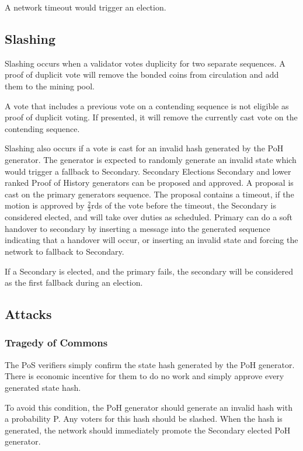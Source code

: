 \documentclass[12pt]{article}
\begin{document}
A network timeout would trigger an election.

\subsection{Slashing}
Slashing occurs when a validator votes duplicity for two separate sequences.  A proof of duplicit vote will remove the bonded coins from circulation and add them to the mining pool.

A vote that includes a previous vote on a contending sequence is not eligible as proof of duplicit voting.  If presented, it will remove the currently cast vote on the contending sequence.

Slashing also occurs if a vote is cast for an invalid hash generated by the PoH generator.  The generator is expected to randomly generate an invalid state which would trigger a fallback to Secondary.
Secondary Elections
Secondary and lower ranked Proof of History generators can be proposed and approved.  A proposal is cast on the primary generators sequence.  The proposal contains a timeout, if the motion is approved by \(\frac{2}{3}\)rds of the vote before the timeout, the Secondary is considered elected, and will take over duties as scheduled.  Primary can do a soft handover to secondary by inserting a message into the generated sequence indicating that a handover will occur, or inserting an invalid state and forcing the network to fallback to Secondary.

If a Secondary is elected, and the primary fails, the secondary will be considered as the first fallback during an election.

\subsection{Attacks}
\subsubsection{Tragedy of Commons}

The PoS verifiers simply confirm the state hash generated by the PoH generator.  There is economic incentive for them to do no work and simply approve every generated state hash.  

To avoid this condition, the PoH generator should generate an invalid hash with a probability P.  Any voters for this hash should be slashed.  When the hash is generated, the network should immediately promote the Secondary elected PoH generator.
\end{document}
